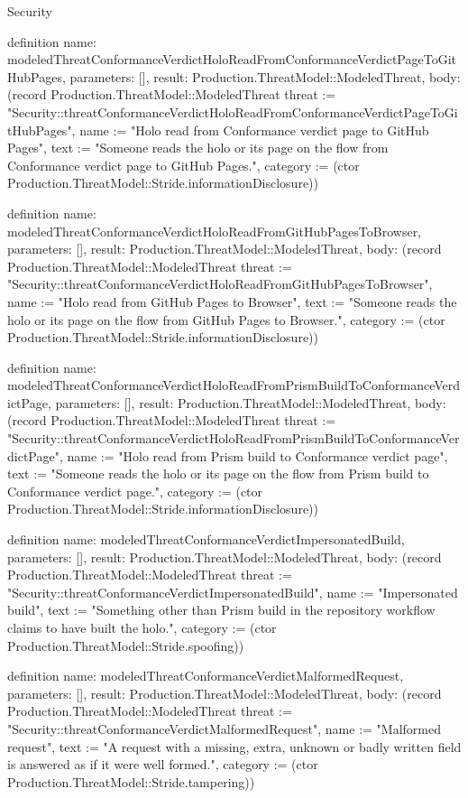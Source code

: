 \begin{lexlean}{Security}
\begin{semanticmodule}
definition{
  name: modeledThreatConformanceVerdictHoloReadFromConformanceVerdictPageToGitHubPages,
  parameters: [],
  result: Production.ThreatModel::ModeledThreat,
  body: (record Production.ThreatModel::ModeledThreat {threat := "Security::threatConformanceVerdictHoloReadFromConformanceVerdictPageToGitHubPages", name := "Holo read from Conformance verdict page to GitHub Pages", text := "Someone reads the holo or its page on the flow from Conformance verdict page to GitHub Pages.", category := (ctor Production.ThreatModel::Stride.informationDisclosure)})
}

definition{
  name: modeledThreatConformanceVerdictHoloReadFromGitHubPagesToBrowser,
  parameters: [],
  result: Production.ThreatModel::ModeledThreat,
  body: (record Production.ThreatModel::ModeledThreat {threat := "Security::threatConformanceVerdictHoloReadFromGitHubPagesToBrowser", name := "Holo read from GitHub Pages to Browser", text := "Someone reads the holo or its page on the flow from GitHub Pages to Browser.", category := (ctor Production.ThreatModel::Stride.informationDisclosure)})
}

definition{
  name: modeledThreatConformanceVerdictHoloReadFromPrismBuildToConformanceVerdictPage,
  parameters: [],
  result: Production.ThreatModel::ModeledThreat,
  body: (record Production.ThreatModel::ModeledThreat {threat := "Security::threatConformanceVerdictHoloReadFromPrismBuildToConformanceVerdictPage", name := "Holo read from Prism build to Conformance verdict page", text := "Someone reads the holo or its page on the flow from Prism build to Conformance verdict page.", category := (ctor Production.ThreatModel::Stride.informationDisclosure)})
}

definition{
  name: modeledThreatConformanceVerdictImpersonatedBuild,
  parameters: [],
  result: Production.ThreatModel::ModeledThreat,
  body: (record Production.ThreatModel::ModeledThreat {threat := "Security::threatConformanceVerdictImpersonatedBuild", name := "Impersonated build", text := "Something other than Prism build in the repository workflow claims to have built the holo.", category := (ctor Production.ThreatModel::Stride.spoofing)})
}

definition{
  name: modeledThreatConformanceVerdictMalformedRequest,
  parameters: [],
  result: Production.ThreatModel::ModeledThreat,
  body: (record Production.ThreatModel::ModeledThreat {threat := "Security::threatConformanceVerdictMalformedRequest", name := "Malformed request", text := "A request with a missing, extra, unknown or badly written field is answered as if it were well formed.", category := (ctor Production.ThreatModel::Stride.tampering)})
}


\end{semanticmodule}
\end{lexlean}
